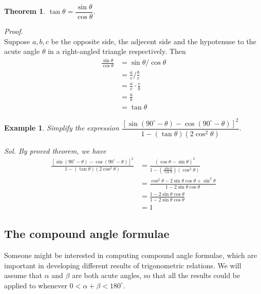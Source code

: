 \documentclass[12pt]{article}
\newtheorem*{theorem}{Theorem}
\newtheorem*{example}{Example}
\renewenvironment{proof}[1][Proof]{\begin{snugshade*} \textit{{#1}.}\\}{\hfill \qedsymbol \end{snugshade*}}
\begin{document}
    \begin{theorem}
        $\tan{\theta}=\dfrac{\sin{\theta}}{\cos{\theta}}$.
    \end{theorem}

    \begin{proof}
        Suppose $a,b,c$ be the opposite side, the adjecent side and the hypotenuse to the acute angle $\theta$ in a right-angled triangle respectively. Then \begin{align*}
            \frac{\sin{\theta}}{\cos{\theta}}&=\sin{\theta}/ \cos{\theta}\\
            &=\frac{a}{c}/ \frac{b}{c}\\
            &=\frac{a}{c}\cdot \frac{c}{b}\\
            &=\frac{a}{b}\\
            &=\tan{\theta}
        \end{align*}
    \end{proof}

    \begin{example}
        Simplify the expression $\dfrac{[\sin(90^\circ - \theta) - \cos(90^\circ - \theta)]^2}{1-(\tan{\theta})(2\cos^2{\theta})}$.

        \textit{ Sol. }By proved theorem, we have \begin{align*}
            \frac{[\sin(90^\circ - \theta) - \cos(90^\circ - \theta)]^2}{1-(\tan{\theta})(2\cos^2{\theta})} &= \frac{(\cos{\theta}-\sin{\theta})^2}{1-(\frac{\sin{\theta}}{\cos{\theta}})(\cos^2{\theta})}\\
            &= \frac{\cos^2{\theta}-2\sin{\theta}\cos{\theta}+\sin^2{\theta}}{1-2\sin{\theta}\cos{\theta}}\\
            &= \frac{1-2\sin{\theta}\cos{\theta}}{1-2\sin{\theta}\cos{\theta}}\\
            &= 1
        \end{align*}
    \end{example}

    \subsection{The compound angle formulae}

    Someone might be interested in computing compound angle formulae, which are important in developing different results of trigonometric relations. We will assume that $\alpha$ and $\beta$ are both acute angles, so that all the results could be applied to whenever $0<\alpha+\beta<180^\circ$.
\end{document}
